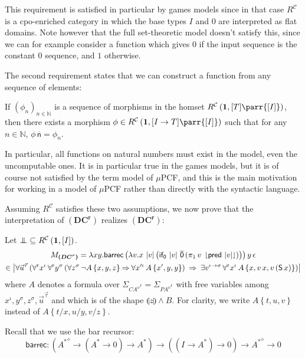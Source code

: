 \documentclass{CSML}
\newcommand*\SortTo\to
\newcommand*\SortA{\sigma}
\newcommand*\SortB{\tau}
\newcommand*\LogSortedTerm[2]{#1^{#2}}
\newcommand*\LogTermA{t}
\newcommand*\LogTermB{u}
\newcommand*\LogTermC{v}
\newcommand*\LogVarA{x}
\newcommand*\LogVarB{y}
\newcommand*\LogVarC{z}
\newcommand*\LogVarD{u}
\newcommand*\LogVarE{v}
\newcommand*\LogConst[1]{\mathsf{#1}}
\newcommand*\LogImp{\mathbin{\Rightarrow}}
\newcommand*\LogAnd{\mathbin{\wedge}}
\newcommand*\LogRel[1]{\llparenthesis#1\rrparenthesis}
\newcommand*\LogRelForm[1]{{#1^\mathrm{r}}}
\newcommand*\LogForallRel{\forall^\mathrm{r}}
\newcommand*\LogFormA{A}
\newcommand*\LogFormB{B}
\newcommand*\LogSubst[1]{\left\{#1\right\}}
\newcommand*\LmSortBot0
\newcommand*\LmSortTo\to
\newcommand*\LmSortA{T}
\newcommand*\LmTerm[2]{#1\mathrel{:}#2}
\newcommand*\LmVarA{x}
\newcommand*\LmVarB{y}
\newcommand*\LmVarE{v}
\newcommand*\LmConst[1]{\mathsf{#1}}
\newcommand*\LmProj{\pi}
\newcommand*\LmInterpForm[1]{{#1}^*}
\newcommand*\LmInterpAxiom[1]{M_{#1}}
\newcommand*\CatC{\mathcal{C}}
\newcommand*\CatR{R}
\newcommand*\CatRC{\CatExp{\CatR}{\CatC}}
\newcommand*\CatExp[2]{#1^{#2}}
\newcommand*\CatPar\parr
\newcommand*\CatRCHomA\phi
\newcommand*\CatTerm{\mathbf{1}}
\newcommand*\CatInterpSort[1]{{\left[#1\right]}}
\newcommand*\RealVal[1]{\left|#1\right|}
\newcommand*\RealBot{{\bot\mkern-11mu\bot}}
\newcommand*\PA{{P\!A}}
\newcommand*\PAom{{\PA^\omega}}
\newcommand*\CA{{C\!A}}
\newcommand*\CAom{{\CA^\omega}}
\newcommand*\CASort\iota
\newcommand*\CASortList[1]{{#1}^\diamond}
\newcommand*\CALogS{\LogConst{S}}
\newcommand*\CAAxName[1]{{\bm{\scriptstyle(#1)}}}
\newcommand*\CADCName{\CAAxName{DC^r}}
\newcommand*\CADC[3]{\forall\LogSortedTerm{\vec{\LogVarD}}{\vec{#3}}\left(\LogForallRel\LogSortedTerm{\LogVarA}{\CASort}\,\LogForallRel\LogSortedTerm{\LogVarB}{#1}\left(\forall\LogSortedTerm{\LogVarC}{#1}\,\neg#2\LogSubst{\LogVarA,\LogVarB,\LogVarC}\LogImp\forall\LogSortedTerm{\LogVarA'}{\CASort}\,#2\LogSubst{\LogVarA',\LogVarB,\LogVarB}\right)\;\LogImp\;\exists\LogSortedTerm{\LogVarE}{\CASort\SortTo#1}\,\LogForallRel\LogSortedTerm{\LogVarA}{\CASort}\,#2\LogSubst{\LogVarA,\LogVarE\,\LogVarA,\LogVarE\left(\CALogS\,\LogVarA\right)}\right)}
\newcommand*\CADCTerm{\lambda\LmVarA\LmVarB.\CALmbarrec\left(\lambda\LmVarE.\LmVarA\,\CALmlen{\LmVarE}\left(\CALmifz\,\CALmlen{\LmVarE}\,\CALmn{0}\left(\LmProj_1\,\CALmind{\LmVarE}{\CALmpred\,\CALmlen{\LmVarE}}\right)\right)\right)\LmVarB\,\CALmnil}
\newcommand*\CALmn[1]{\LmConst{\overline{#1}}}
\newcommand*\CALmnSort{I}
\newcommand*\CALmbarrec{\LmConst{barrec}}
\newcommand*\CALmbarrecSort[2]{\left(\CASortList{#1}\LmSortTo\left(#1\LmSortTo#2\right)\LmSortTo#1\right)\LmSortTo\left(\left(\CALmnSort\LmSortTo#1\right)\LmSortTo#2\right)\LmSortTo\CASortList{#1}\LmSortTo#2}
\newcommand*\CALmifz{\LmConst{if_0}}
\newcommand*\CALmpred{\LmConst{pred}}
\newcommand*\CALmnil{\epsilon}
\newcommand*\CALmlen[1]{\left|#1\right|}
\newcommand*\CALmind[2]{#1\,\downharpoonright\mkern-5mu#2\mkern-5mu\downharpoonleft}
\begin{document}
\noindent This requirement is satisfied in particular by games models since in that case $\CatRC$ is a cpo-enriched category in which the base types $\CALmnSort$ and $\LmSortBot$ are interpreted as flat domains. Note however that the full set-theoretic model doesn't satisfy this, since we can for example consider a function which gives $0$ if the input sequence is the constant $0$ sequence, and $1$ otherwise.\par
The second requirement states that we can construct a function from any sequence of elements:
\begin{defi}
\label{sequence}
If $\left(\CatRCHomA_n\right)_{n\in\mathbb{N}}$ is a sequence of morphisms in the homset $\CatRC\left(\CatTerm,\CatInterpSort{\LmSortA}\CatPar\CatInterpSort{\CALmnSort}\right)$, then there exists a morphism $\CatRCHomA\in\CatRC\left(\CatTerm,\CatInterpSort{\CALmnSort\LmSortTo\LmSortA}\CatPar\CatInterpSort{\CALmnSort}\right)$ such that for any $n\in\mathbb{N}$, $\CatRCHomA\,\CALmn{n}=\CatRCHomA_n$.
\end{defi}
In particular, all functions on natural numbers must exist in the model, even the uncomputable ones. It is in particular true in the games models, but it is of course not satisfied by the term model of $\mu$PCF, and this is the main motivation for working in a model of $\mu$PCF rather than directly with the syntactic language.\par
Assuming $\CatRC$ satisfies these two assumptions, we now prove that the interpretation of $\CADCName$ realizes $\CADCName$:
\begin{lem}
Let $\RealBot\subseteq\CatRC\left(\CatTerm,\CatInterpSort{\CALmnSort}\right)$.
\begin{multline*}
\LmInterpAxiom{\CADCName}=\CADCTerm\\*
\in\RealVal{\CADC{\SortA}{\LogFormA}{\SortB}}
\end{multline*}
where $\LogFormA$ denotes a formula over $\Sigma_\LogRelForm{\CAom}=\Sigma_\LogRelForm{\PAom}$ with free variables among $\LogSortedTerm{\LogVarA}{\CASort},\LogSortedTerm{\LogVarB}{\SortA},\LogSortedTerm{\LogVarC}{\SortA},\LogSortedTerm{\vec{\LogVarD}}{\vec{\SortB}}$ and which is of the shape $\LogRel{\LogVarC}\LogAnd\LogFormB$. For clarity, we write $\LogFormA\LogSubst{\LogTermA,\LogTermB,\LogTermC}$ instead of $\LogFormA\LogSubst{\LogTermA/\LogVarA,\LogTermB/\LogVarB,\LogTermC/\LogVarC}$.
\end{lem}
\proof
Recall that we use the bar recursor:
$$\LmTerm{\CALmbarrec}{\CALmbarrecSort{\LmInterpForm{\LogFormA}}{\LmSortBot}}$$
\end{document}
